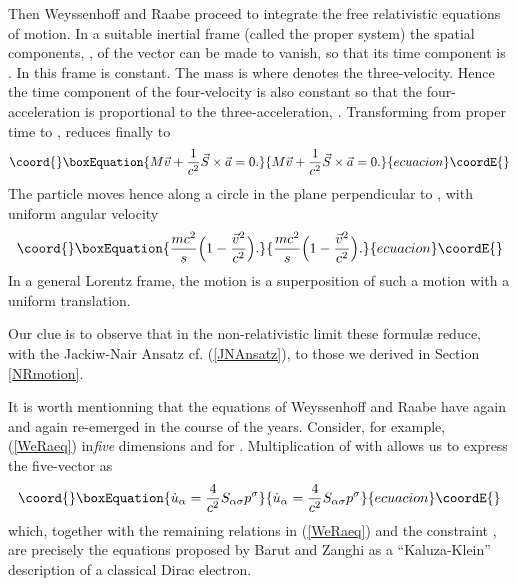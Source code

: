 \documentclass[a4paper,11pt]{article}
\providecommand{\half}{{\scriptstyle{\frac{1}{2}}}}
\providecommand{\vx}{{\vec x}}
\def\vv{{\vec v}}
\def\vP{{\vec P}}
\def\vS{\vec{S}}
\def\vx{{\vec x}}
\begin{document}
Then Weyssenhoff and Raabe proceed to integrate the free relativistic
equations of motion.
In a suitable inertial frame (called the proper system)
the spatial components, \coordHE{}, of the
vector \coordHE{} can be made to vanish,
so that its time component is \coordHE{}.
In this frame \myHighlight{$\vS$}\coordHE{} is constant. The mass is
\myHighlight{$m=M/\sqrt{1-(\vv/c)^2}$}\coordHE{} where \myHighlight{$v_{i}=u_{i}\sqrt{1-(\vv/c)^2}$}\coordHE{}
denotes the three-velocity. Hence the time component of the four-velocity
is also constant so that the four-acceleration is proportional
to the three-acceleration, \myHighlight{${\vec a}=d^2\vx/dt^2$}\coordHE{}.
Transforming from proper time to \coordHE{}, \myHighlight{$\vP=0$}\coordHE{} reduces finally to
\begin{equation}\coord{}\boxEquation{
     M\vv+\frac{1}{c^2}\vS\times{\vec a}=0.
}{
     M\vv+\frac{1}{c^2}\vS\times{\vec a}=0.
}{ecuacion}\coordE{}\end{equation}
The particle moves hence along a circle
in the plane perpendicular to \myHighlight{$\vS$}\coordHE{},
with uniform angular velocity
\begin{equation}\coord{}\boxEquation{
     \frac{mc^2}{s}\Big(1-\frac{\vv^2}{c^2}\Big).
}{
     \frac{mc^2}{s}\Big(1-\frac{\vv^2}{c^2}\Big).
}{ecuacion}\coordE{}\end{equation}
In a general Lorentz frame, the motion is a superposition of
such a motion with a uniform translation.

Our clue is to observe that in the
non-relativistic limit these formul{\ae} reduce,
with the Jackiw-Nair Ansatz \coordHE{}
cf. (\ref{JNAnsatz}),
to those we derived in Section \ref{NRmotion}.

It is worth mentionning that the equations of
Weyssenhoff and Raabe have again and again re-emerged
in the course of the years. Consider, for example,
(\ref{WeRaeq}) in{\it five} dimensions and for
\myHighlight{$s=\half$}\coordHE{}. Multiplication of \coordHE{} with \coordHE{}
allows us to express the five-vector \coordHE{}
as
\begin{equation}\coord{}\boxEquation{
     \dot{u}_{\alpha}=\frac{4}{c^2}S_{\alpha\sigma}p^\sigma
}{
     \dot{u}_{\alpha}=\frac{4}{c^2}S_{\alpha\sigma}p^\sigma
}{ecuacion}\coordE{}\end{equation}
which, together with the remaining relations in (\ref{WeRaeq})
and the constraint \coordHE{}, are
precisely the equations proposed by Barut and Zanghi
\cite{Barut} as a ``Kaluza-Klein'' description of
a classical Dirac electron.
\end{document}
